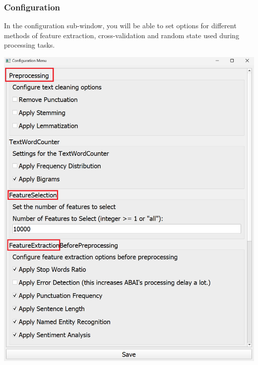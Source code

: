 \subsubsection{Configuration}
In the configuration sub-window, you will be able to set options for different methods of feature extraction, cross-validation and random state used during processing tasks. 
\begin{center}
    \includegraphics[width=17cm]{Images/Usage/Local/ConfigurationWindow.png}
\end{center}
\clearpage
